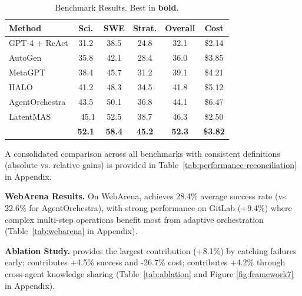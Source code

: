\documentclass{article}
\theoremstyle{plain}
\theoremstyle{definition}
\theoremstyle{remark}
\begin{document}
\begin{table}[t]
	\caption{\mars{} Benchmark Results. Best in \textbf{bold}.}
	\label{tab:mars_results}
	\centering
	\small
	
	\begin{tabular}{@{}lccccc@{}}
		\toprule
		\textbf{Method} & \textbf{Sci.} & \textbf{SWE} & \textbf{Strat.} & \textbf{Overall} & \textbf{Cost} \\
		\midrule
		GPT-4 + ReAct & 31.2 & 38.5 & 24.8 & 32.1 & \$2.14 \\
		AutoGen & 35.8 & 42.1 & 28.4 & 36.0 & \$3.85 \\
		MetaGPT & 38.4 & 45.7 & 31.2 & 39.1 & \$4.21 \\
		HALO & 41.2 & 48.3 & 34.5 & 41.8 & \$5.12 \\
		AgentOrchestra & 43.5 & 50.1 & 36.8 & 44.1 & \$6.47 \\
		LatentMAS & ~45.1 & 52.5 & 38.7 & 46.3 & \$2.50 \\
		\textbf{\amore{}} & \textbf{52.1} & \textbf{58.4} & \textbf{45.2} & \textbf{52.3} & \textbf{\$3.82} \\
		\bottomrule
	\end{tabular}
\end{table}


A consolidated comparison across all benchmarks with consistent definitions (absolute vs. relative gains) is provided in Table~\ref{tab:performance-reconciliation} in Appendix.

\textbf{WebArena Results.}
On WebArena, \amore{} achieves 28.4\% average success rate (vs. 22.6\% for AgentOrchestra), with strong performance on GitLab (+9.4\%) where complex multi-step operations benefit most from adaptive orchestration (Table~\ref{tab:webarena} in Appendix).

\textbf{Ablation Study.}
\rcm{} provides the largest contribution (+8.1\%) by catching failures early; \car{} contributes +4.5\% success and -26.7\% cost; \uma{} contributes +4.2\% through cross-agent knowledge sharing (Table~\ref{tab:ablation} and Figure \ref{fig:framework7} in Appendix).
\end{document}

